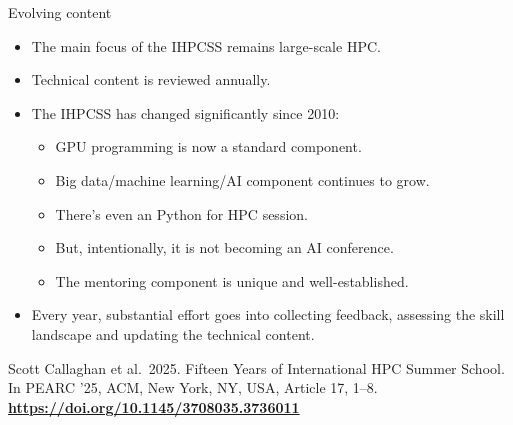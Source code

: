 \documentclass[
  11pt,
  ignorenonframetext,
  aspectratio=169]{beamer}
\providecommand{\tightlist}{%
  \setlength{\itemsep}{0pt}\setlength{\parskip}{0pt}}
\begin{document}
\begin{frame}{Evolving content}
\label{evolving-content}
\begin{itemize}
\item
  The main focus of the IHPCSS remains large-scale HPC.

  \pause
\item
  Technical content is reviewed annually.

  \pause
\item
  The IHPCSS has changed significantly since 2010:

  \pause

  \begin{itemize}
  \tightlist
  \item
    GPU programming is now a standard component.
  \item
    Big data/machine learning/AI component continues to grow.
  \item
    There's even an Python for HPC session.
  \item
    But, intentionally, it is not becoming an AI conference.
  \item
    The mentoring component is unique and well-established.
  \end{itemize}

  \pause
\item
  Every year, substantial effort goes into collecting feedback, assessing the skill landscape and updating the technical content.
\end{itemize}

\pause

\small

Scott Callaghan et al.~2025. Fifteen Years of International HPC Summer School. In PEARC '25, ACM, New York, NY, USA, Article 17, 1--8. \textbf{\alert{\url{https://doi.org/10.1145/3708035.3736011}}}
\end{frame}
\end{document}
